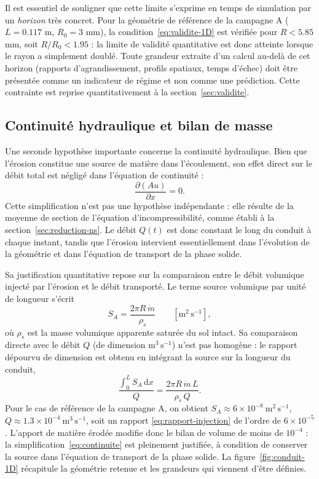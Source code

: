 \documentclass[11pt,a4paper]{report}
\newcommand{\mdot}{\dot{m}}
\begin{document}
Il est essentiel de souligner que cette limite s'exprime en temps de simulation par un \emph{horizon}
très concret. Pour la géométrie de référence de la campagne A (\(L = 0.117\) m, \(R_0 = 3\) mm), la
condition~\eqref{eq:validite-1D} est vérifiée pour \(R < 5.85\) mm, soit \(R/R_0 < 1.95\) : la limite de
validité quantitative est donc atteinte lorsque le rayon a simplement doublé. Toute grandeur extraite
d'un calcul au-delà de cet horizon (rapports d'agrandissement, profils spatiaux, temps d'échec) doit
être présentée comme un indicateur de régime et non comme une prédiction. Cette contrainte est reprise
quantitativement à la section~\ref{sec:validite}.

\subsection{Continuité hydraulique et bilan de masse}
\label{sec:bilan-masse}

Une seconde hypothèse importante concerne la continuité hydraulique. Bien que l'érosion constitue une
source de matière dans l'écoulement, son effet direct sur le débit total est négligé dans l'équation de
continuité :
\begin{equation}
\frac{\partial (Au)}{\partial x} = 0 .
\label{eq:continuite}
\end{equation}
Cette simplification n'est pas une hypothèse indépendante : elle résulte de la moyenne de section de
l'équation d'incompressibilité, comme établi à la section~\ref{sec:reduction-ns}. Le débit \(Q(t)\) est
donc constant le long du conduit à chaque instant, tandis que l'érosion intervient essentiellement dans
l'évolution de la géométrie et dans l'équation de transport de la phase solide.

Sa justification quantitative repose sur la comparaison entre le débit volumique injecté par l'érosion
et le débit transporté. Le terme source volumique par unité de longueur s'écrit
\begin{equation}
S_A = \frac{2\pi R\,\mdot}{\rho_s}
\qquad \left[\mathrm{m^2\,s^{-1}}\right],
\label{eq:source-vol}
\end{equation}
où \(\rho_s\) est la masse volumique apparente saturée du sol intact. Sa comparaison directe avec le
débit \(Q\) (de dimension \(\mathrm{m^3\,s^{-1}}\)) n'est pas homogène : le rapport dépourvu de
dimension est obtenu en intégrant la source sur la longueur du conduit,
\begin{equation}
\frac{\displaystyle\int_0^L S_A\,\mathrm{d}x}{Q}
= \frac{2\pi R\,\mdot\,L}{\rho_s\,Q} .
\label{eq:rapport-injection}
\end{equation}
Pour le cas de référence de la campagne A, on obtient \(S_A \approx 6\times10^{-8}\ \mathrm{m^2\,s^{-1}}\),
\(Q \approx 1.3\times10^{-4}\ \mathrm{m^3\,s^{-1}}\), soit un rapport
\eqref{eq:rapport-injection} de l'ordre de \(6\times10^{-5}\). L'apport de matière érodée modifie donc le
bilan de volume de moins de \(10^{-4}\) : la simplification~\eqref{eq:continuite} est pleinement
justifiée, à condition de conserver la source dans l'équation de transport de la phase solide.
La figure~\ref{fig:conduit-1D} récapitule la géométrie retenue et les grandeurs qui viennent d'être
définies.
\end{document}
